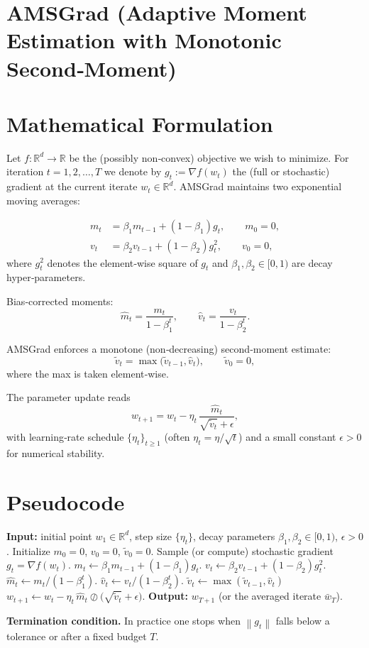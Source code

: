\documentclass{article}
\newcommand{\R}{\mathbb{R}}
\newcommand{\norm}[1]{\left\lVert #1 \right\rVert}
\begin{document}
\section*{AMSGrad (Adaptive Moment Estimation with Monotonic Second‑Moment)}

\section*{Mathematical Formulation}
Let $f:\R^{d}\rightarrow\R$ be the (possibly non‑convex) objective we wish to minimize.  
For iteration $t=1,2,\dots,T$ we denote by $g_{t}:=\nabla f(w_{t})$ the (full or stochastic) gradient at the current iterate $w_{t}\in\R^{d}$.  
AMSGrad maintains two exponential moving averages:

\[
\begin{aligned}
m_{t} &= \beta_{1} m_{t-1} + (1-\beta_{1}) g_{t}, \qquad m_{0}=0,\\[4pt]
v_{t} &= \beta_{2} v_{t-1} + (1-\beta_{2}) g_{t}^{2}, \qquad v_{0}=0,
\end{aligned}
\]
where $g_{t}^{2}$ denotes the element‑wise square of $g_{t}$ and $\beta_{1},\beta_{2}\in[0,1)$ are decay hyper‑parameters.

Bias‑corrected moments:
\[
\hat{m}_{t}= \frac{m_{t}}{1-\beta_{1}^{t}},\qquad
\hat{v}_{t}= \frac{v_{t}}{1-\beta_{2}^{t}} .
\]

AMSGrad enforces a monotone (non‑decreasing) second‑moment estimate:
\[
\tilde{v}_{t}= \max\bigl(\tilde{v}_{t-1},\hat{v}_{t}\bigr),\qquad \tilde{v}_{0}=0,
\]
where the max is taken element‑wise.

The parameter update reads
\[
w_{t+1}= w_{t} - \eta_{t}\,\frac{\hat{m}_{t}}{\sqrt{\tilde{v}_{t}}+\epsilon},
\]
with learning‑rate schedule $\{\eta_{t}\}_{t\ge 1}$ (often $\eta_{t}=\eta/\sqrt{t}$) and a small constant $\epsilon>0$ for numerical stability.

\section*{Pseudocode}
\begin{algorithm}[H]
\caption{AMSGrad}
\begin{algorithmic}[1]
\State \textbf{Input:} initial point $w_{1}\in\R^{d}$, step size $\{\eta_{t}\}$, decay parameters $\beta_{1},\beta_{2}\in[0,1)$, $\epsilon>0$.
\State Initialize $m_{0}=0$, $v_{0}=0$, $\tilde v_{0}=0$.
    \State Sample (or compute) stochastic gradient $g_{t}=\nabla f(w_{t})$.
    \State $m_{t}\gets \beta_{1}m_{t-1}+(1-\beta_{1})g_{t}$.
    \State $v_{t}\gets \beta_{2}v_{t-1}+(1-\beta_{2})g_{t}^{2}$.
    \State $\hat{m}_{t}\gets m_{t}/(1-\beta_{1}^{t})$.
    \State $\hat{v}_{t}\gets v_{t}/(1-\beta_{2}^{t})$.
    \State $\tilde v_{t}\gets \max(\tilde v_{t-1},\hat v_{t})$ 
    \State $w_{t+1}\gets w_{t}-\eta_{t}\,\hat{m}_{t}\oslash\bigl(\sqrt{\tilde v_{t}}+\epsilon\bigr)$.
\EndFor
\State \textbf{Output:} $w_{T+1}$ (or the averaged iterate $\bar w_T$).
\end{algorithmic}
\end{algorithm}
\textbf{Termination condition.} In practice one stops when $\norm{g_{t}}$ falls below a tolerance or after a fixed budget $T$.
\end{document}

